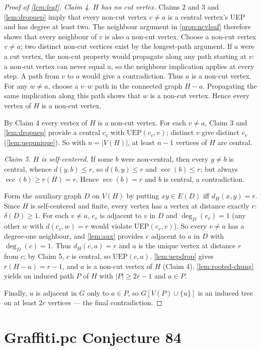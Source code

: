 \documentclass[11pt]{article}
\theoremstyle{definition}
\newcommand{\ecc}{\operatorname{ecc}}
\begin{document}
\begin{proof}[Proof of \cref{lem:leaf}]
\emph{Claim 4.} \emph{$H$ has no cut vertex.}
Claims 2 and 3 and \cref{lem:dropuep} imply that every non-cut
vertex $v\ne a$ is a central vertex's UEP and has degree at least two.
The neighbour argument in \cref{prop:ncvleaf} therefore
shows that every neighbour of $v$ is also a non-cut vertex.
Choose a non-cut vertex $v\ne a$; two distinct non-cut vertices exist
by the longest-path argument.
If $a$ were a cut vertex, the non-cut property would propagate along
any path starting at $v$: a non-cut vertex can never equal $a$, so
the neighbour implication applies at every step. A path from $v$
to $a$ would give a contradiction. Thus $a$ is a non-cut vertex.
For any $w\ne a$, choose a $v$--$w$ path in the connected graph $H-a$.
Propagating the same implication along this path shows that $w$
is a non-cut vertex. Hence every vertex of $H$ is a non-cut vertex.

By Claim 4 every vertex of $H$ is a non-cut vertex.  For each $v\ne a$,
Claim 3 and \cref{lem:dropuep} provide a central $c_v$ with
$\mathrm{UEP}(c_v,v)$; distinct $v$ give distinct $c_v$
(\cref{lem:uepunique}).  So with $n=|V(H)|$, at least $n-1$ vertices of
$H$ are central.

\emph{Claim 5.} \emph{$H$ is self-centered.}
If some $b$ were non-central, then every $y\ne b$ is central, whence
$d(y,b)\le r$, so $d(b,y)\le r$ and $\ecc(b)\le r$; but always
$\ecc(b)\ge r(H)=r$.  Hence $\ecc(b)=r$ and $b$ is central, a
contradiction.

Form the auxiliary graph $D$ on $V(H)$ by putting $xy\in E(D)$ iff
$d_H(x,y)=r$.  Since $H$ is self-centered and finite, every vertex has a
vertex at distance exactly $r$: $\delta(D)\ge1$.  For each $v\ne a$, $c_v$
is adjacent to $v$ in $D$ and $\deg_D(c_v)=1$ (any other $w$ with
$d(c_v,w)=r$ would violate $\mathrm{UEP}(c_v,v)$).  So every $v\ne a$ has a
degree-one neighbour, and \cref{lem:aux} provides $c$ adjacent to $a$
in $D$ with $\deg_D(c)=1$.  Thus $d_H(c,a)=r$ and $a$ is the unique vertex
at distance $r$ from $c$; by Claim 5, $c$ is central, so
$\mathrm{UEP}(c,a)$.  \cref{lem:uepdrop} gives $r(H-a)=r-1$, and $a$
is a non-cut vertex of $H$ (Claim 4).  \cref{lem:rooted-chung} yields
an induced path $P$ of $H$ with $|P|\ge2r-1$ and $a\in P$.

Finally, $u$ is adjacent in $G$ only to $a\in P$, so $G[V(P)\cup\{u\}]$ is
an induced tree on at least $2r$ vertices --- the final contradiction.
\end{proof}

\section{Graffiti.pc Conjecture 84}\label{sec:main}
\end{document}
